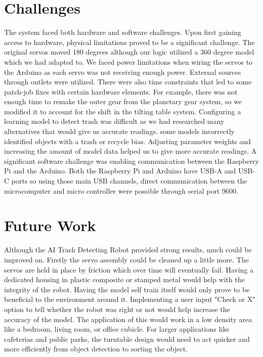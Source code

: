 \documentclass[12pt]{article}
\begin{document}
\section*{Challenges}
\indent The system faced both hardware and software challenges. Upon first gaining access to hardware, physical limitations proved to be a significant challenge. The original servos moved 180 degrees although our logic utilized a 360 degree model which we had adapted to. We faced power limitations when wiring the servos to the Arduino as each servo was not receiving enough power. External sources through outlets were utilized.
\newline
There were also time constraints that led to some patch-job fixes with certain hardware elements. For example, there was not enough time to remake the outer gear from the planetary gear system, so we modified it to account for the shift in the tilting table system.
\newline
\indent Configuring a learning model to detect trash was difficult as we had researched many alternatives that would give us accurate readings. some models incorrectly identified objects with a trash or recycle bias. Adjusting parameter weights and increasing the amount of model data helped us to give more accurate readings.
\newline
\indent A significant software challenge was enabling communication between the Raspberry Pi and the Arduino. Both the Raspberry Pi and Arduino have USB-A and USB-C ports so using those main USB channels, direct communication between the microcomputer and micro controller were possible through serial port 9600. 
\newline

\section*{Future Work}
\indent Although the AI Trash Detecting Robot provided strong results, much could be improved on. 
\newline
\indent Firstly the servo assembly could be cleaned up a little more. The servos are held in place by friction which over time will eventually fail. Having a dedicated housing in plastic composite or stamped metal would help with the integrity of the robot. 
\newline
\indent Having the model self train itself would only prove to be beneficial to the environment around it. Implementing a user input "Check or X" option to tell whether the robot was right or not would help increase the accuracy of the model.
\newline
\indent The application of this would work in a low density area like a bedroom, living room, or office cubicle. For larger applications like cafeterias and public parks, the turntable design would need to act quicker and more efficiently from object detection to sorting the object. 
\end{document}

